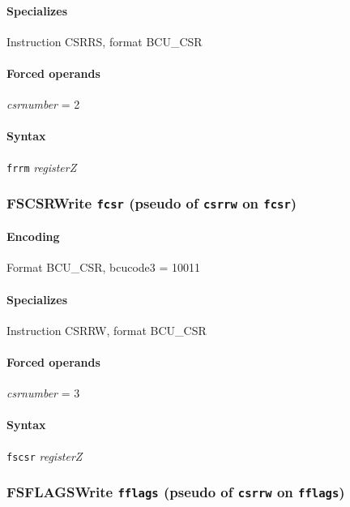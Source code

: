 {


\paragraph{Specializes} Instruction CSRRS, format BCU\_CSR

\paragraph{Forced operands} \emph{csrnumber} = 2

\paragraph{Syntax} \texttt{frrm} \emph{registerZ}
\newpage
\subsubsection[{\small FSCSR: Write \texttt{fcsr} (pseudo of \texttt{csrrw} on \texttt{fcsr})}]{FSCSR\hfill Write \texttt{fcsr} (pseudo of \texttt{csrrw} on \texttt{fcsr})}
\label{instr:FSCSR}

\paragraph{Encoding} Format \textsf{BCU\_CSR, bcucode3 = 10011}\\



\paragraph{Specializes} Instruction CSRRW, format BCU\_CSR

\paragraph{Forced operands} \emph{csrnumber} = 3

\paragraph{Syntax} \texttt{fscsr} \emph{registerZ}
\newpage
\subsubsection[{\small FSFLAGS: Write \texttt{fflags} (pseudo of \texttt{csrrw} on \texttt{fflags})}]{FSFLAGS\hfill Write \texttt{fflags} (pseudo of \texttt{csrrw} on \texttt{fflags})}
\label{instr:FSFLAGS}

}
